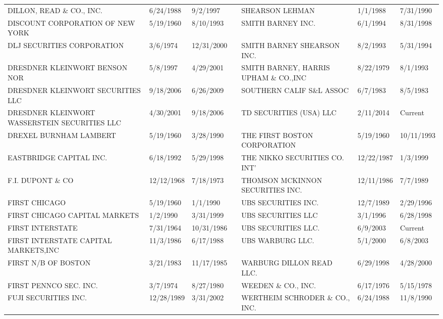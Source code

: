 \documentclass{article}
\begin{document}
\begin{adjustbox}{max width=\textwidth}
\begin{tabular}{lllllll}
DILLON, READ \& CO., INC.            & 6/24/1988 & 9/2/1997 &  & SHEARSON LEHMAN                      & 1/1/1988 & 7/31/1990 \\
DISCOUNT CORPORATION OF NEW YORK     & 5/19/1960 & 8/10/1993 &  & SMITH BARNEY INC.                    & 6/1/1994 & 8/31/1998 \\
DLJ SECURITIES CORPORATION          & 3/6/1974 & 12/31/2000 &  & SMITH BARNEY SHEARSON INC.           & 8/2/1993 & 5/31/1994 \\
DRESDNER KLEINWORT BENSON NOR   & 5/8/1997 & 4/29/2001 &  & SMITH BARNEY, HARRIS UPHAM \& CO.,INC & 8/22/1979 & 8/1/1993 \\
DRESDNER KLEINWORT SECURITIES LLC & 9/18/2006 & 6/26/2009 &  & SOUTHERN CALIF S\&L ASSOC            & 6/7/1983 & 8/5/1983 \\
DRESDNER KLEINWORT WASSERSTEIN SECURITIES LLC & 4/30/2001 & 9/18/2006 &  & TD SECURITIES (USA) LLC & 2/11/2014 & Current \\
DREXEL BURNHAM LAMBERT              & 5/19/1960 & 3/28/1990 &  & THE FIRST BOSTON CORPORATION        & 5/19/1960 & 10/11/1993 \\
EASTBRIDGE CAPITAL INC.              & 6/18/1992 & 5/29/1998 &  & THE NIKKO SECURITIES CO. INT'       & 12/22/1987 & 1/3/1999 \\
F.I. DUPONT \& CO                     & 12/12/1968 & 7/18/1973 &  & THOMSON MCKINNON SECURITIES INC.    & 12/11/1986 & 7/7/1989 \\
FIRST CHICAGO                       & 5/19/1960 & 1/1/1990 &  & UBS SECURITIES INC.                 & 12/7/1989 & 2/29/1996 \\
FIRST CHICAGO CAPITAL MARKETS       & 1/2/1990 & 3/31/1999 &  & UBS SECURITIES LLC                  & 3/1/1996 & 6/28/1998 \\
FIRST INTERSTATE                     & 7/31/1964 & 10/31/1986 &  & UBS SECURITIES LLC.                 & 6/9/2003 & Current \\
FIRST INTERSTATE CAPITAL MARKETS,INC & 11/3/1986 & 6/17/1988 &  & UBS WARBURG LLC.                    & 5/1/2000 & 6/8/2003 \\
FIRST N/B OF BOSTON                  & 3/21/1983 & 11/17/1985 &  & WARBURG DILLON READ LLC.            & 6/29/1998 & 4/28/2000 \\
FIRST PENNCO SEC. INC.               & 3/7/1974 & 8/27/1980 &  & WEEDEN \& CO., INC.                   & 6/17/1976 & 5/15/1978 \\
FUJI SECURITIES INC.                & 12/28/1989 & 3/31/2002 &  & WERTHEIM SCHRODER \& CO., INC.        & 6/24/1988 & 11/8/1990 \\

\end{tabular}
\end{adjustbox}
\end{document}

